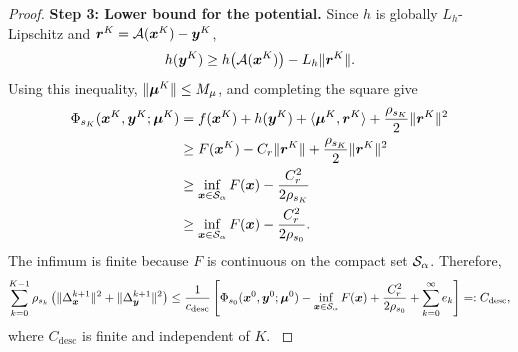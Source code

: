 \begin{proof}
\textbf{Step 3: Lower bound for the potential.}
{\color{blue}
Since $h$ is globally $L_h$-Lipschitz and
$\bm{r}^K=\mathcal{A}(\bm{x}^K)-\bm{y}^K$,
\[
    h(\bm{y}^K)
    \ge h\bigl(\mathcal{A}(\bm{x}^K)\bigr)-L_h\|\bm{r}^K\|.
\]
Using this inequality, $\|\bm{\mu}^K\|\le M_\mu$, and completing the square give
\[
\begin{aligned}
    \Phi_{s_K}(\bm{x}^K,\bm{y}^K;\bm{\mu}^K)
    &=
    f(\bm{x}^K)+h(\bm{y}^K)
    +\langle\bm{\mu}^K,\bm{r}^K\rangle
    +\frac{\rho_{s_K}}{2}\|\bm{r}^K\|^2\\
    &\ge
    F(\bm{x}^K)-C_r\|\bm{r}^K\|
    +\frac{\rho_{s_K}}{2}\|\bm{r}^K\|^2\\
    &\ge
    \inf_{\bm{x}\in\mathcal{S}_\alpha}F(\bm{x})
    -\frac{C_r^2}{2\rho_{s_K}}\\
    &\ge
    \inf_{\bm{x}\in\mathcal{S}_\alpha}F(\bm{x})
    -\frac{C_r^2}{2\rho_{s_0}}.
\end{aligned}
\]
The infimum is finite because $F$ is continuous on the compact set
$\mathcal{S}_\alpha$.
Therefore,
\[
    \sum_{k=0}^{K-1}
    \rho_{s_k}\left(\|\Delta_{\bm{x}}^{k+1}\|^2+\|\Delta_{\bm{y}}^{k+1}\|^2\right)
    \le
    \frac{1}{c_{\mathrm{desc}}}
    \left[
    \Phi_{s_0}(\bm{x}^0,\bm{y}^0;\bm{\mu}^0)
    -
    \inf_{\bm{x}\in\mathcal{S}_\alpha}F(\bm{x})
    +
    \frac{C_r^2}{2\rho_{s_0}}
    +
    \sum_{k=0}^{\infty}e_k
    \right]
    =:
    C_{\mathrm{desc}},
\]
where $C_{\mathrm{desc}}$ is finite and independent of $K$.
}
\end{proof}

